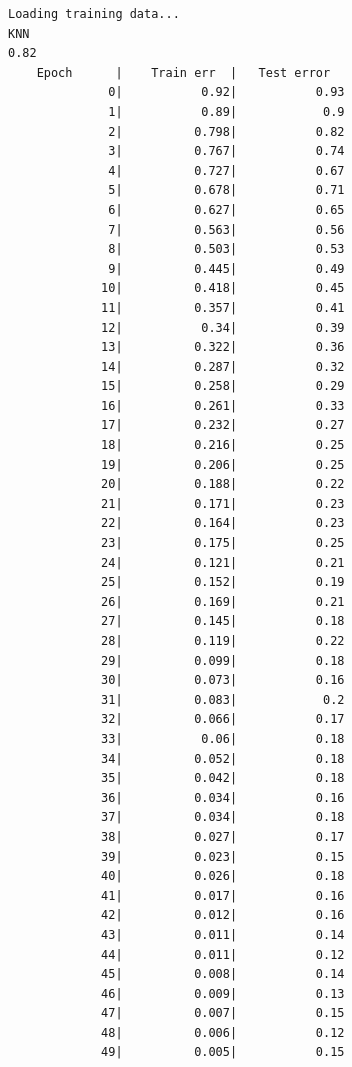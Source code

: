 \documentclass[12pt,fleqn]{article}\usepackage{../../common}
\begin{document}
\begin{verbatim}
Loading training data...
KNN
0.82
    Epoch      |    Train err  |   Test error  
              0|           0.92|           0.93
              1|           0.89|            0.9
              2|          0.798|           0.82
              3|          0.767|           0.74
              4|          0.727|           0.67
              5|          0.678|           0.71
              6|          0.627|           0.65
              7|          0.563|           0.56
              8|          0.503|           0.53
              9|          0.445|           0.49
             10|          0.418|           0.45
             11|          0.357|           0.41
             12|           0.34|           0.39
             13|          0.322|           0.36
             14|          0.287|           0.32
             15|          0.258|           0.29
             16|          0.261|           0.33
             17|          0.232|           0.27
             18|          0.216|           0.25
             19|          0.206|           0.25
             20|          0.188|           0.22
             21|          0.171|           0.23
             22|          0.164|           0.23
             23|          0.175|           0.25
             24|          0.121|           0.21
             25|          0.152|           0.19
             26|          0.169|           0.21
             27|          0.145|           0.18
             28|          0.119|           0.22
             29|          0.099|           0.18
             30|          0.073|           0.16
             31|          0.083|            0.2
             32|          0.066|           0.17
             33|           0.06|           0.18
             34|          0.052|           0.18
             35|          0.042|           0.18
             36|          0.034|           0.16
             37|          0.034|           0.18
             38|          0.027|           0.17
             39|          0.023|           0.15
             40|          0.026|           0.18
             41|          0.017|           0.16
             42|          0.012|           0.16
             43|          0.011|           0.14
             44|          0.011|           0.12
             45|          0.008|           0.14
             46|          0.009|           0.13
             47|          0.007|           0.15
             48|          0.006|           0.12
             49|          0.005|           0.15
\end{verbatim}
\end{document}
